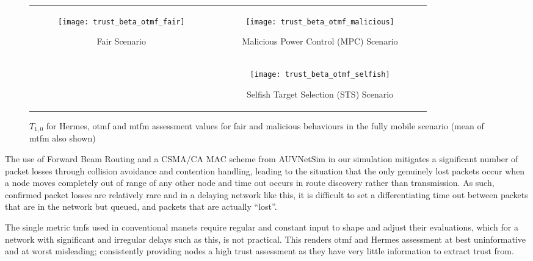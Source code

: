 \begin{figure*}[t]
	\centering
	\begin{tabular}{cc}
		\multirow{2}{*}{
			\begin{subfigure}{0.5\textwidth}	
				\texttt{[image: trust\_beta\_otmf\_fair]}
				\caption{Fair Scenario}
				\label{fig:all_mobile_fair_beta}
			\end{subfigure}
		}&
		\begin{subfigure}{0.5\textwidth}
			\texttt{[image: trust\_beta\_otmf\_malicious]} 
			\caption{Malicious Power Control (MPC) Scenario}
			\label{fig:all_mobile_badmouthing_beta}
		\end{subfigure} \\
		&
		\begin{subfigure}{0.5\textwidth}	
			\texttt{[image: trust\_beta\_otmf\_selfish]} 
			\caption{Selfish Target Selection (STS) Scenario}
			\label{fig:all_mobile_selfish_beta}
		\end{subfigure}
	\end{tabular}
	\caption{$T_{1,0}$ for Hermes, \gls{otmf} and \gls{mtfm} assessment values for fair and malicious behaviours in the fully mobile scenario (mean of \gls{mtfm} also shown)}
	\label{fig:otmf_beta_comparison}
\end{figure*}
%
The use of Forward Beam Routing and a CSMA/CA MAC scheme from AUVNetSim \cite{Miquel2008} in our simulation mitigates a significant number of packet losses through collision avoidance and contention handling, leading to the situation that the only genuinely lost packets occur when a node moves completely out of range of any other node and time out occurs in route discovery rather than transmission.
As such, confirmed packet losses are relatively rare and in a delaying network like this, it is difficult to set a differentiating time out between packets that are in the network but queued, and packets that are actually ``lost''.

The single metric \glspl{tmf} used in conventional \gls{manet}s require regular and constant input to shape and adjust their evaluations, which for a network with significant and irregular delays such as this, is not practical.
This renders \gls{otmf} and Hermes assessment at best uninformative and at worst misleading; consistently providing nodes a high trust assessment as they have very little information to extract trust from. 

